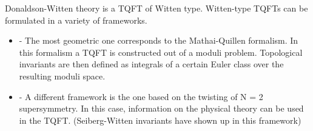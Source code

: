 Donaldson-Witten theory is a TQFT of Witten type. Witten-type TQFTs can be
formulated in a variety of frameworks. 
\begin{itemize}
	\item 
- The most geometric one corresponds to the Mathai-Quillen formalism. In this
formalism a TQFT is constructed out of a moduli problem. Topological invariants
are then defined as integrals of a certain Euler class over the resulting moduli
space.\cite{cernTQFT}
	\item 
- A different framework is the one based on the twisting of N = 2 supersymmetry.
In this case, information on the physical theory can be used in the
TQFT. (Seiberg-Witten invariants have shown up in this framework)
\end{itemize}


